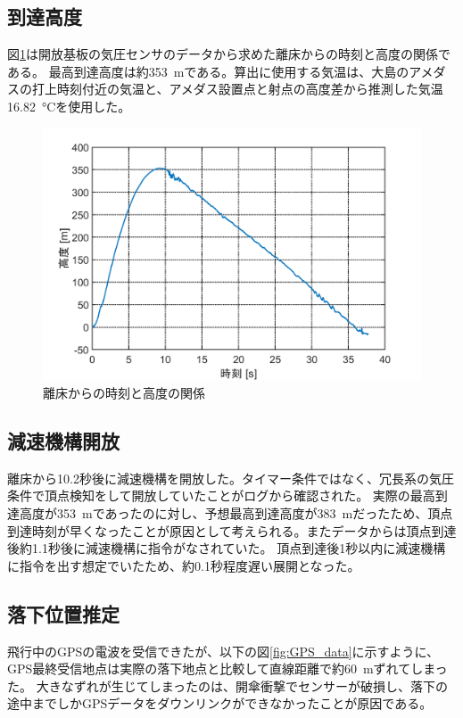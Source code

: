 \documentclass[a4paper,11pt,uplatex]{jsarticle}
\begin{document}
\subsection{到達高度}
図\ref{fig:height_data}は開放基板の気圧センサのデータから求めた離床からの時刻と高度の関係である。
最高到達高度は約\SI{353}{m}である。算出に使用する気温は、大島のアメダスの打上時刻付近の気温と、アメダス設置点と射点の高度差から推測した気温\SI{16.82}{\degreeCelsius}を使用した。
\begin{figure}[H]
	\centering
	\includegraphics[width=0.8\linewidth]{pic_avi/height_data.png}
	\caption{離床からの時刻と高度の関係}
	\label{fig:height_data}
\end{figure}


\subsection{減速機構開放}
離床から10.2秒後に減速機構を開放した。タイマー条件ではなく、冗長系の気圧条件で頂点検知をして開放していたことがログから確認された。
実際の最高到達高度が\SI{353}{m}であったのに対し、予想最高到達高度が\SI{383}{m}だったため、頂点到達時刻が早くなったことが原因として考えられる。またデータからは頂点到達後約1.1秒後に減速機構に指令がなされていた。
頂点到達後1秒以内に減速機構に指令を出す想定でいたため、約0.1秒程度遅い展開となった。

\subsection{落下位置推定}
飛行中のGPSの電波を受信できたが、以下の図\ref{fig:GPS_data}に示すように、GPS最終受信地点は実際の落下地点と比較して直線距離で約\SI{60}{m}ずれてしまった。
大きなずれが生じてしまったのは、開傘衝撃でセンサーが破損し、落下の途中までしかGPSデータをダウンリンクができなかったことが原因である。
\end{document}

